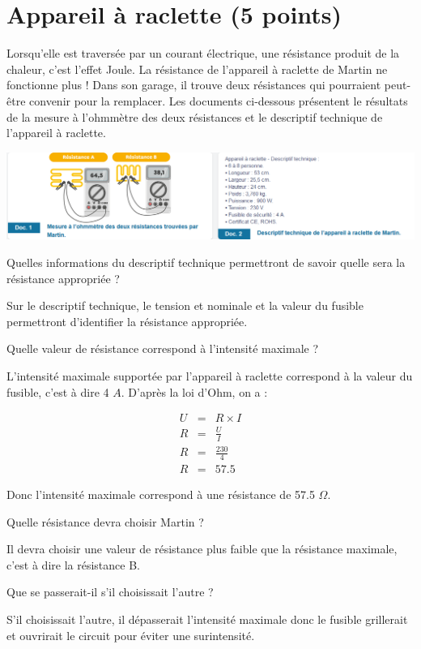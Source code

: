 \section{Appareil à raclette (5 points)}

Lorsqu'elle est traversée par un courant électrique, une résistance produit de la chaleur, c'est l'effet Joule.
La résistance de l'appareil à raclette de Martin ne fonctionne plus ! Dans son garage, il trouve deux résistances qui pourraient peut-être convenir pour la remplacer. 
Les documents ci-dessous présentent le résultats de la mesure à l'ohmmètre des deux résistances et le descriptif technique de l'appareil à raclette.
	\begin{center}
		\includegraphics[scale=0.7]{img/docs}
	\end{center}

\begin{questions}
	\question[1] Quelles informations du descriptif technique permettront de savoir quelle sera la résistance appropriée ?
	\begin{solution}
		Sur le descriptif technique, le tension et nominale et la valeur du fusible permettront d'identifier la résistance appropriée.
	\end{solution}
	
	\question[1\half] Quelle valeur de résistance correspond à l'intensité maximale ?
	\begin{solution}
		L'intensité maximale supportée par l'appareil à raclette correspond à la valeur du fusible, c'est à dire 4 $A$. D'après la loi d'Ohm, on a :
		
		\begin{eqnarray*}
			U &=& R \times I \\
			R &=& \frac{U}{I} \\
			R &=& \frac{230}{4} \\
			R &=& \num{57.5}
		\end{eqnarray*}
	
	Donc l'intensité maximale correspond à une résistance de \num{57.5} $\Omega$.
	\end{solution}
	
	\question[1\half] Quelle résistance devra choisir Martin ?
	\begin{solution}
		Il devra choisir une valeur de résistance plus faible que la résistance maximale, c'est à dire la résistance B.
	\end{solution}
	
	\question[1] Que se passerait-il s'il choisissait l'autre ?
	\begin{solution}
		S'il choisissait l'autre, il dépasserait l'intensité maximale donc le fusible grillerait et ouvrirait le circuit pour éviter une surintensité.
	\end{solution}
\end{questions}